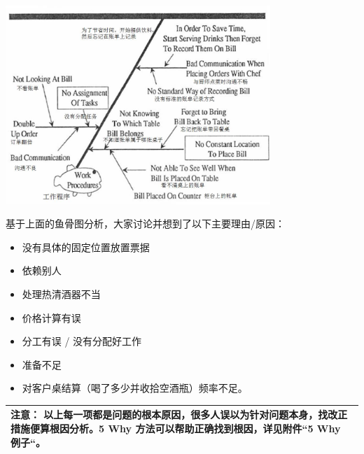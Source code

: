 
\includegraphics[width=10cm]{club151.jpg}

基于上面的鱼骨图分析，大家讨论并想到了以下主要理由/原因：

\begin{itemize}
\tightlist
\item
  没有具体的固定位置放置票据
\end{itemize}

\begin{itemize}
\tightlist
\item
  依赖别人
\end{itemize}

\begin{itemize}
\tightlist
\item
  处理热清酒器不当
\end{itemize}

\begin{itemize}
\tightlist
\item
  价格计算有误
\end{itemize}

\begin{itemize}
\tightlist
\item
  分工有误 / 没有分配好工作
\end{itemize}

\begin{itemize}
\tightlist
\item
  准备不足
\end{itemize}

\begin{itemize}
\tightlist
\item
  对客户桌结算（喝了多少并收拾空酒瓶）频率不足。
\end{itemize}

\begin{longtable}[]{@{}l@{}}
\toprule
\endhead
注意：
以上每一项都是问题的根本原因，很多人误以为针对问题本身，找改正措施便算根因分析。5
Why 方法可以帮助正确找到根因，详见附件``5 Why 例子``。\tabularnewline
\bottomrule
\end{longtable}

